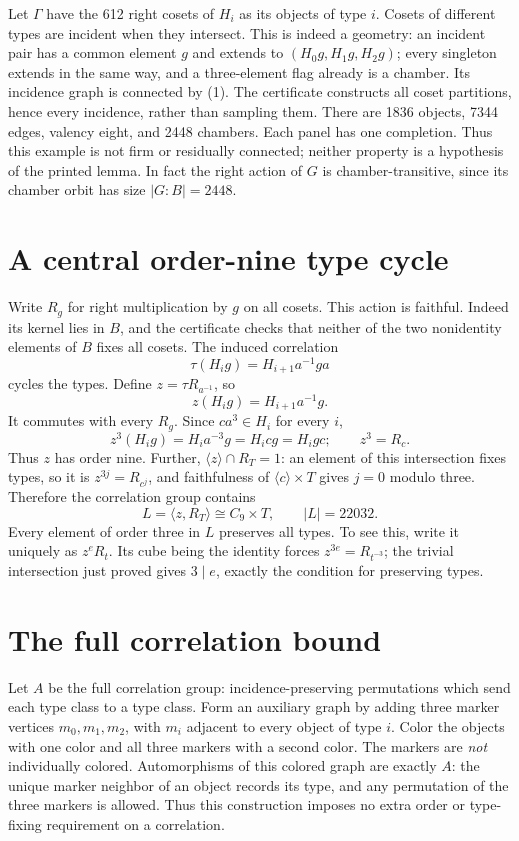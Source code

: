 \documentclass[11pt,a4paper]{article}
\newcommand{\gen}[1]{\langle #1\rangle}
\begin{document}
Let $\Gamma$ have the 612 right cosets of $H_i$ as its objects of type $i$.
Cosets of different types are incident when they intersect. This is
indeed a geometry: an incident pair has a common element $g$ and extends
to $(H_0g,H_1g,H_2g)$; every singleton extends in the same way, and a
three-element flag already is a chamber. Its incidence graph is connected
by (1). The certificate constructs all coset partitions, hence every
incidence, rather than sampling them. There are 1836 objects, 7344 edges,
valency eight, and 2448 chambers. Each panel has one completion. Thus this
example is not firm or residually connected; neither property is a
hypothesis of the printed lemma. In fact the right action of $G$ is
chamber-transitive, since its chamber orbit has size $|G:B|=2448$.

\section{A central order-nine type cycle}
Write $R_g$ for right multiplication by $g$ on all cosets. This action is
faithful. Indeed its kernel lies in $B$, and the certificate checks that
neither of the two nonidentity elements of $B$ fixes all cosets.
The induced correlation
\[
 \tau(H_i g)=H_{i+1}a^{-1}ga
\]
cycles the types. Define $z=\tau R_{a^{-1}}$, so
\[
 z(H_i g)=H_{i+1}a^{-1}g.                                  \tag{2}
\]
It commutes with every $R_g$. Since $ca^3\in H_i$ for every $i$,
\[
 z^3(H_i g)=H_i a^{-3}g=H_i cg=H_i gc;
 \qquad z^3=R_c.                                          \tag{3}
\]
Thus $z$ has order nine. Further,
$\gen z\cap R_T=1$: an element of this intersection fixes types, so it
is $z^{3j}=R_{c^j}$, and faithfulness of $\gen c\times T$ gives $j=0$
modulo three. Therefore the correlation group contains
\[
 L=\gen{z,R_T}\cong C_9\times T,\qquad |L|=22032.           \tag{4}
\]
Every element of order three in $L$ preserves all types. To see this,
write it uniquely as $z^eR_t$. Its cube being the identity forces
$z^{3e}=R_{t^{-3}}$; the trivial intersection just proved gives
$3\mid e$, exactly the condition for preserving types.

\section{The full correlation bound}
Let $A$ be the full correlation group: incidence-preserving permutations
which send each type class to a type class. Form an auxiliary graph by
adding three marker vertices $m_0,m_1,m_2$, with $m_i$ adjacent to every
object of type $i$. Color the objects with one color and all three markers
with a second color. The markers are \emph{not} individually colored.
Automorphisms of this colored graph are exactly $A$: the unique marker
neighbor of an object records its type, and any permutation of the three
markers is allowed. Thus this construction imposes no extra order or
type-fixing requirement on a correlation.
\end{document}
